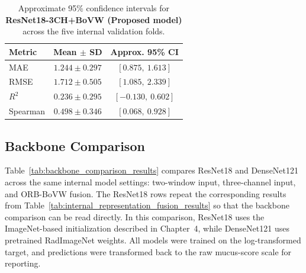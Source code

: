 \begin{table}[H]
\centering
\caption{Approximate 95\% confidence intervals for \textbf{ResNet18-3CH+BoVW (Proposed model)} across the five internal validation folds.}
\label{tab:proposed_model_ci}
\small
\begin{tabular}{lcc}
\toprule
Metric & Mean \(\pm\) SD & Approx. 95\% CI \\
\midrule
MAE & \(\mathbf{1.244 \pm 0.297}\) & \([0.875,\ 1.613]\) \\
RMSE & \(\mathbf{1.712 \pm 0.505}\) & \([1.085,\ 2.339]\) \\
\(R^2\) & \(\mathbf{0.236 \pm 0.295}\) & \([-0.130,\ 0.602]\) \\
Spearman & \(\mathbf{0.498 \pm 0.346}\) & \([0.068,\ 0.928]\) \\
\bottomrule
\end{tabular}
\end{table}


\subsection{Backbone Comparison}
\label{sec:backbone_comparison_results}

Table~\ref{tab:backbone_comparison_results} compares ResNet18 and DenseNet121 across the same internal model settings: two-window input, three-channel input, and ORB-BoVW fusion. The ResNet18 rows repeat the corresponding results from Table~\ref{tab:internal_representation_fusion_results} so that the backbone comparison can be read directly. In this comparison, ResNet18 uses the ImageNet-based initialization described in Chapter~4, while DenseNet121 uses pretrained RadImageNet weights. All models were trained on the log-transformed target, and predictions were transformed back to the raw mucus-score scale for reporting.


